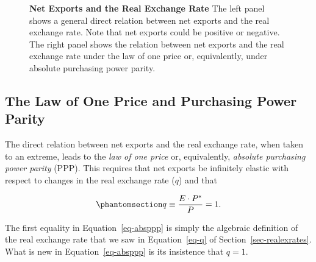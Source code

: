 \documentclass[
  letterpaper,
]{book}
\theoremstyle{plain}
\theoremstyle{remark}
\begin{document}
\begin{figure}


\caption{\label{fig-net_exports_real_exchange_rate}\textbf{Net Exports
and the Real Exchange Rate} The left panel shows a general direct
relation between net exports and the real exchange rate. Note that net
exports could be positive or negative. The right panel shows the
relation between net exports and the real exchange rate under the law of
one price or, equivalently, under absolute purchasing power parity.}

\end{figure}%

\subsection{The Law of One Price and Purchasing Power
Parity}\label{sec-appp}

The direct relation between net exports and the real exchange rate, when
taken to an extreme, leads to the \emph{law of one price} or,
equivalently, \emph{absolute purchasing power parity}
 (PPP). This requires that net
exports be infinitely elastic with respect to changes in the real
exchange rate (\(q\)) and that

\begin{equation}\phantomsection\label{eq-absppp}{
q\equiv\frac{E\cdot P^*}{P}=1.
}\end{equation}

The first equality in Equation~\ref{eq-absppp} is simply the algebraic
definition of the real exchange rate that we saw in Equation~\ref{eq-q}
of Section~\ref{sec-realexrates}. What is new in
Equation~\ref{eq-absppp} is its insistence that \(q=1\).
\end{document}
